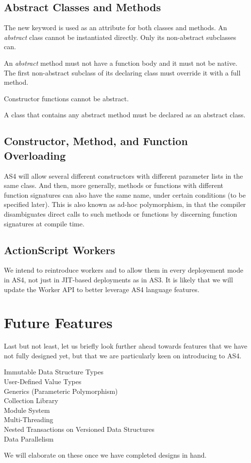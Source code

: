\subsection{Abstract Classes and Methods}
The new keyword  is used as an attribute for both classes and
methods. An {\em abstract} class cannot be instantiated directly. Only its
non-abstract subclasses can.

An {\em abstract} method must not have a function body and it must not be
native. The first non-abstract subclass of its declaring class must override it
with a full method.

Constructor functions cannot be abstract.

A class that contains any abstract method must be declared as an abstract class.

\subsection{Constructor, Method, and Function Overloading}
AS4 will allow several different constructors with different parameter lists in
the same class. And then, more generally, methods or functions with different
function signatures can also have the same name, under certain conditions (to be specified later). This is also known
as ad-hoc polymorphism, in that the compiler disambiguates direct calls to such
methods or functions by discerning function signatures at compile time.

\subsection{ActionScript Workers}
We intend to reintroduce workers and to allow them in every deployement mode in
AS4, not just in JIT-based deployments as in AS3. It is likely that we will
update the Worker API to better leverage AS4 language features.

\section{Future Features}
\label{future}
Last but not least, let us briefly look further ahead towards features that we
have not fully designed yet, but that we are particularly keen on introducing to AS4.
\begin{description}
\item[Immutable Data Structure Types]
\item[User-Defined Value Types]
\item[Generics (Parameteric Polymorphism)]
\item[Collection Library]
\item[Module System]
\item[Multi-Threading]
\item[Nested Transactions on Versioned Data Structures]
\item[Data Parallelism]
\end{description}
We will elaborate on these once we have completed designs in hand.

